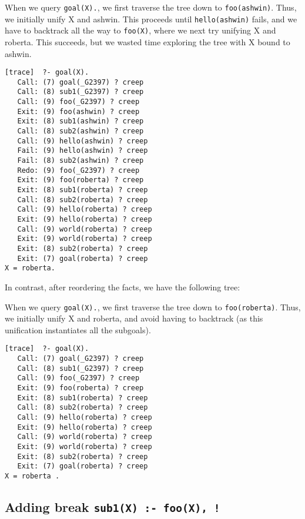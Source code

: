 \documentclass[paper=a4, fontsize=11pt]{scrartcl} %
\numberwithin{equation}{section} %
\numberwithin{figure}{section} %
\numberwithin{table}{section} %
\begin{document}
When we query \texttt{goal(X).}, we first traverse the tree down to \texttt{foo(ashwin)}. Thus, we initially unify X and ashwin. This proceeds until \texttt{hello(ashwin)} fails, and we have to backtrack all the way to \texttt{foo(X)}, where we next try unifying X and roberta. This succeeds, but we wasted time exploring the tree with X bound to ashwin.

\begin{lstlisting}
[trace]  ?- goal(X).
   Call: (7) goal(_G2397) ? creep
   Call: (8) sub1(_G2397) ? creep
   Call: (9) foo(_G2397) ? creep
   Exit: (9) foo(ashwin) ? creep
   Exit: (8) sub1(ashwin) ? creep
   Call: (8) sub2(ashwin) ? creep
   Call: (9) hello(ashwin) ? creep
   Fail: (9) hello(ashwin) ? creep
   Fail: (8) sub2(ashwin) ? creep
   Redo: (9) foo(_G2397) ? creep
   Exit: (9) foo(roberta) ? creep
   Exit: (8) sub1(roberta) ? creep
   Call: (8) sub2(roberta) ? creep
   Call: (9) hello(roberta) ? creep
   Exit: (9) hello(roberta) ? creep
   Call: (9) world(roberta) ? creep
   Exit: (9) world(roberta) ? creep
   Exit: (8) sub2(roberta) ? creep
   Exit: (7) goal(roberta) ? creep
X = roberta.
\end{lstlisting}

In contrast, after reordering the facts, we have the following tree:


When we query \texttt{goal(X).}, we first traverse the tree down to \texttt{foo(roberta)}. Thus, we initially unify X and roberta, and avoid having to backtrack (as this unification instantiates all the subgoals).

\begin{lstlisting}
[trace]  ?- goal(X).
   Call: (7) goal(_G2397) ? creep
   Call: (8) sub1(_G2397) ? creep
   Call: (9) foo(_G2397) ? creep
   Exit: (9) foo(roberta) ? creep
   Exit: (8) sub1(roberta) ? creep
   Call: (8) sub2(roberta) ? creep
   Call: (9) hello(roberta) ? creep
   Exit: (9) hello(roberta) ? creep
   Call: (9) world(roberta) ? creep
   Exit: (9) world(roberta) ? creep
   Exit: (8) sub2(roberta) ? creep
   Exit: (7) goal(roberta) ? creep
X = roberta .
\end{lstlisting}

\subsection{Adding break \texttt{sub1(X) :- foo(X), !}}
\end{document}
